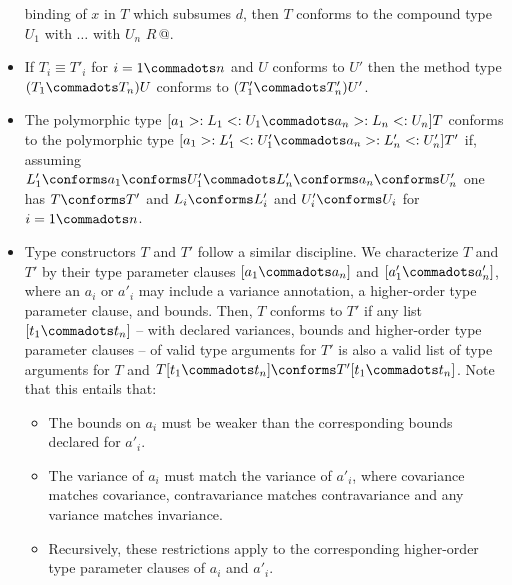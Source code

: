 \begin{itemize}
      binding of $x$ in $T$ which subsumes $d$, then $T$ conforms to the
      compound type ~\lstinline@$U_1$ with $\ldots$ with $U_n$ {$R\,$}@.
\item If
        $T_i \equiv T'_i$ for $i = 1 \commadots n$ and $U$ conforms to $U'$ 
        then the method type $(T_1 \commadots T_n) U$ conforms to
        $(T'_1 \commadots T'_n) U'$.
\item The polymorphic type
$[a_1 >: L_1 <: U_1 \commadots a_n >: L_n <: U_n] T$ conforms to the polymorphic type
$[a_1 >: L'_1 <: U'_1 \commadots a_n >: L'_n <: U'_n] T'$ if, assuming
$L'_1 \conforms a_1 \conforms U'_1 \commadots L'_n \conforms a_n \conforms U'_n$ 
one has $T \conforms T'$ and $L_i \conforms L'_i$ and $U'_i \conforms U_i$
for $i = 1 \commadots n$.
\item Type constructors $T$ and $T'$ follow a similar discipline. We characterize $T$ and $T'$ by their type parameter clauses
$[a_1 \commadots a_n]$ and
$[a'_1 \commadots a'_n ]$, where an $a_i$ or $a'_i$ may include a variance annotation, a higher-order type parameter clause, and bounds. Then, $T$ conforms to $T'$ if any list $[t_1 \commadots t_n]$ -- with declared variances, bounds and higher-order type parameter clauses -- of valid type arguments for $T'$ is also a valid list of type arguments for $T$ and $T[t_1 \commadots t_n] \conforms T'[t_1 \commadots t_n]$. Note that this entails that:
      \begin{itemize}
      \item
      The bounds on $a_i$ must be weaker than the corresponding bounds declared for $a'_i$. 
      \item 
      The variance of $a_i$ must match the variance of $a'_i$, where covariance matches covariance, contravariance matches contravariance and any variance matches invariance.
      \item 
      Recursively, these restrictions apply to the corresponding higher-order type parameter clauses of $a_i$ and $a'_i$.
      \end{itemize}

\end{itemize}

